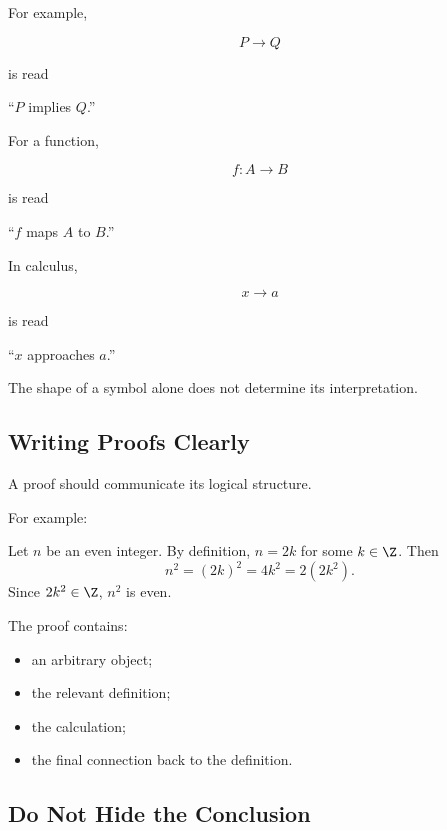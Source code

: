 For example,

\[ P\to Q \]

is read

\begin{center}
``\(P\) implies \(Q\).''
\end{center}

For a function,

\[ f:A\to B \]

is read

\begin{center}
``\(f\) maps \(A\) to \(B\).''
\end{center}

In calculus,

\[ x\to a \]

is read

\begin{center}
``\(x\) approaches \(a\).''
\end{center}

The shape of a symbol alone does not determine its interpretation.

\subsection{Writing Proofs Clearly}
\label{subsec:writing-proofs-clearly}

A proof should communicate its logical structure.

For example:

\begin{center}
Let \(n\) be an even integer. By definition, \(n=2k\) for some \(k\in\Z\).
Then
\[ n^2=(2k)^2=4k^2=2(2k^2). \]
Since \(2k^2\in\Z\), \(n^2\) is even.
\end{center}

The proof contains:

\begin{itemize}
    \item an arbitrary object;
    \item the relevant definition;
    \item the calculation;
    \item the final connection back to the definition.
\end{itemize}

\subsection{Do Not Hide the Conclusion}
\label{subsec:do-not-hide-conclusion}

